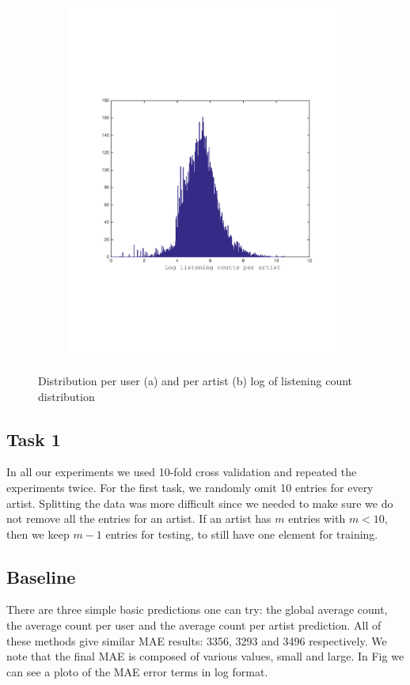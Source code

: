 \begin{figure}[h]
\begin{subfigure}[b]{0.45\textwidth}
    \includegraphics[width=\textwidth]{figures/histCountPerArtist.pdf}
    \caption{}
  \end{subfigure}
  \caption{Distribution per user (a) and per artist (b) log of listening count distribution}
  \label{fig:user_artist_distribution}
\end{figure}

 
\subsection{Task 1}
In all our experiments we used 10-fold cross validation and repeated the experiments twice.
For the first task, we randomly omit 10 entries for every artist.
Splitting the data was more difficult since we needed to make sure we do not
remove all the entries for an artist. If an artist has $m$ entries with $m < 10$, then we keep $m-1$ entries for testing,
 to still have one element for training.
 
 
\subsection{Baseline}
There are three simple basic predictions one can try: the global average count, the average count per user and the average count
per artist prediction. All of these methods give similar MAE results: 3356, 3293 and 3496 respectively.
We note that the final MAE is composed of various values, small and large. In Fig we can see a ploto of the MAE error terms in log format.


